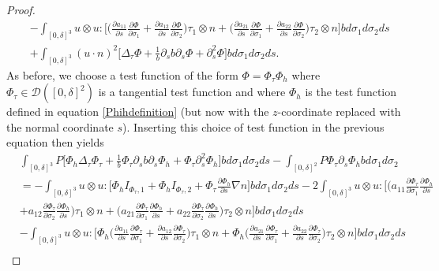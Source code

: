 \documentclass[12pt,a4paper]{article}
\theoremstyle{definition}
\theoremstyle{remark}
\numberwithin{equation}{section}
\begin{document}
\begin{proof}
\begin{align*}
&- \int_{[0,\delta]^3} u \otimes u : \bigg[  \bigg( \frac{\partial a_{11}}{\partial s} \frac{\partial \Phi}{\partial \sigma_1 } + \frac{\partial a_{12}}{\partial s} \frac{\partial \Phi}{\partial \sigma_2} \bigg) \tau_1 \otimes n + \bigg( \frac{\partial a_{21}}{\partial s} \frac{\partial \Phi}{\partial \sigma_1 } + \frac{\partial a_{22}}{\partial s} \frac{\partial \Phi}{\partial \sigma_2 } \bigg) \tau_2 \otimes n \bigg] b d \sigma_1 d\sigma_2 ds \\
&+ \int_{[0,\delta]^3} (u \cdot n)^2 \bigg[ \Delta_\tau \Phi + \frac{1}{b} \partial_s b \partial_s \Phi + \partial_s^2 \Phi \bigg] b d \sigma_1 d\sigma_2 ds.
\end{align*}
As before, we choose a test function of the form $\Phi = \Phi_\tau \Phi_h$ where $\Phi_\tau \in \mathcal{D} ([0,\delta]^2)$ is a tangential test function and where $\Phi_h$ is the test function defined in equation \eqref{Phihdefinition} (but now with the $z$-coordinate replaced with the normal coordinate $s$). Inserting this choice of test function in the previous equation then yields
\begin{align*}
&\int_{[0,\delta]^3} P \bigg[ \Phi_h \Delta_\tau \Phi_\tau + \frac{1}{b} \Phi_\tau \partial_s b \partial_s \Phi_h + \Phi_\tau \partial_s^2 \Phi_h \bigg] b d \sigma_1 d\sigma_2 ds - \int_{[0,\delta]^2} P \Phi_\tau \partial_s \Phi_h b d \sigma_1 d \sigma_2  \\
&= - \int_{[0,\delta]^3} u \otimes u : \bigg[ \Phi_h I_{\Phi_\tau,1} + \Phi_h I_{\Phi_\tau,2} + \Phi_\tau \frac{\partial \Phi_h}{\partial s} \nabla n \bigg] b d \sigma_1 d\sigma_2 ds - 2 \int_{[0,\delta]^3} u \otimes u : \bigg[  \bigg( a_{11} \frac{\partial \Phi_\tau}{\partial \sigma_1} \frac{\partial \Phi_h}{\partial s} \\
&+ a_{12} \frac{\partial \Phi_\tau}{\partial \sigma_2} \frac{\partial \Phi_h}{\partial s} \bigg) \tau_1 \otimes n + \bigg( a_{21} \frac{\partial \Phi_\tau}{\partial \sigma_1} \frac{\partial \Phi_h}{\partial s} + a_{22} \frac{\partial \Phi_\tau}{\partial \sigma_2} \frac{\partial \Phi_h}{\partial s} \bigg) \tau_2 \otimes n \bigg] b d \sigma_1 d\sigma_2 ds \\
&- \int_{[0,\delta]^3} u \otimes u : \bigg[ \Phi_h \bigg( \frac{\partial a_{11}}{\partial s} \frac{\partial \Phi_\tau}{\partial \sigma_1 } + \frac{\partial a_{12}}{\partial s} \frac{\partial \Phi_\tau}{\partial \sigma_2} \bigg) \tau_1 \otimes n + \Phi_h \bigg( \frac{\partial a_{21}}{\partial s} \frac{\partial \Phi_\tau}{\partial \sigma_1 } + \frac{\partial a_{22}}{\partial s} \frac{\partial \Phi_\tau}{\partial \sigma_2 } \bigg) \tau_2 \otimes n \bigg] b d \sigma_1 d\sigma_2 ds \\

\end{align*}
\end{proof}
\end{document}
